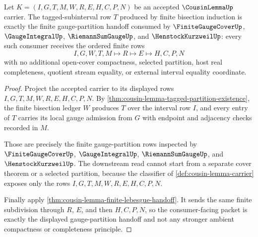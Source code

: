 \begin{theorem}
\label{thm:cousin-lemma-gauge-partition-handoff}
Let $K=(I,G,T,M,W,R,E,H,C,P,N)$ be an accepted $\CousinLemmaUp$ carrier. The tagged-subinterval row $T$ produced by finite bisection induction is exactly the finite gauge-partition handoff consumed by $\FiniteGaugeCoverUp$, $\GaugeIntegralUp$, $\RiemannSumGaugeUp$, and $\HenstockKurzweilUp$: every such consumer receives the ordered finite rows
$$
I,G,W,T,M \longmapsto R \longmapsto E \longmapsto H,C,P,N
$$
with no additional open-cover compactness, selected partition, host real completeness, quotient stream equality, or external interval equality coordinate.
\end{theorem}
\begin{proof}
Project the accepted carrier to its displayed rows $I,G,T,M,W,R,E,H,C,P,N$. By \autoref{thm:cousin-lemma-tagged-partition-existence}, the finite bisection ledger $W$ produces $T$ over the interval row $I$, and every entry of $T$ carries its local gauge admission from $G$ with endpoint and adjacency checks recorded in $M$.

Those are precisely the finite gauge-partition rows inspected by $\FiniteGaugeCoverUp$, $\GaugeIntegralUp$, $\RiemannSumGaugeUp$, and $\HenstockKurzweilUp$. The downstream read cannot start from a separate cover theorem or a selected partition, because the classifier of \autoref{def:cousin-lemma-carrier} exposes only the rows $I,G,T,M,W,R,E,H,C,P,N$.

Finally apply \autoref{thm:cousin-lemma-finite-lebesgue-handoff}. It sends the same finite subdivision through $R$, $E$, and then $H,C,P,N$, so the consumer-facing packet is exactly the displayed gauge-partition handoff and not any stronger ambient compactness or completeness principle.
\end{proof}

